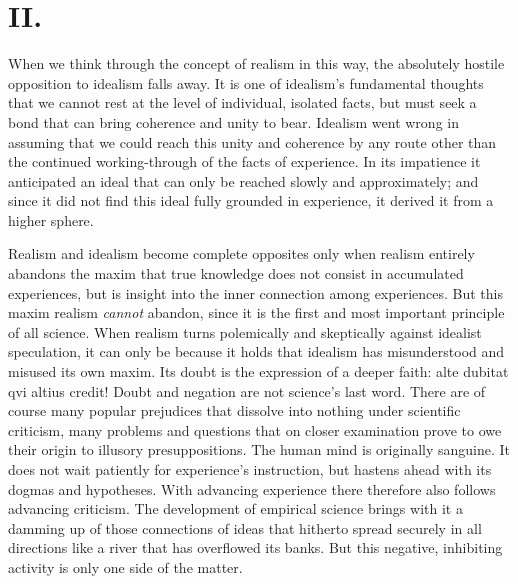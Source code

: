 \documentclass[12pt,a4paper,openany]{book}
\newcommand{\opage}[1]{\marginnote{\footnotesize\textit{[#1]}}}
\begin{document}
\section*{II.}

When we think through the concept of realism in this way, the absolutely hostile opposition to idealism falls away. It is one of idealism's fundamental thoughts that we cannot rest at the level of individual, isolated facts, but must seek a bond that can bring coherence and unity to bear. Idealism went wrong in assuming that we could reach this unity and coherence by any route other than the continued working-through of the facts of experience. In its impatience it anticipated an ideal that can
\opage{5}only be reached slowly and approximately; and since it did not find this ideal fully grounded in experience, it derived it from a higher sphere.

Realism and idealism become complete opposites only when realism entirely abandons the maxim that true knowledge does not consist in accumulated experiences, but is insight into the inner connection among experiences. But this maxim realism \emph{cannot} abandon, since it is the first and most important principle of all science. When realism turns polemically and skeptically against idealist speculation, it can only be because it holds that idealism has misunderstood and misused its own maxim. Its doubt is the expression of a deeper faith: alte dubitat qvi altius credit! Doubt and negation are not science's last word. There are of course many popular prejudices that dissolve into nothing under scientific criticism, many problems and questions that on closer examination prove to owe their origin to illusory presuppositions. The human mind is originally sanguine. It does not wait patiently for experience's instruction, but hastens ahead with its dogmas and hypotheses. With advancing experience there therefore also follows advancing criticism. The development of empirical science brings with it a damming up of those connections of ideas that hitherto spread securely in all directions like a river that has overflowed its banks. But this negative, inhibiting activity is only one side of the matter.
\end{document}
